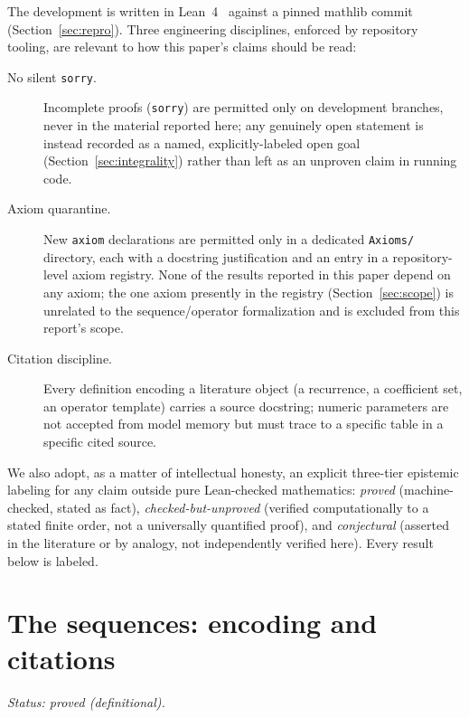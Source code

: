 \documentclass[11pt]{article}
\begin{document}
The development is written in Lean~4~\cite{lean4} against a pinned mathlib
commit (Section~\ref{sec:repro}). Three engineering disciplines, enforced by
repository tooling, are relevant to how this paper's claims should be read:

\begin{description}
  \item[No silent \texttt{sorry}.] Incomplete proofs (\texttt{sorry}) are
    permitted only on development branches, never in the material reported
    here; any genuinely open statement is instead recorded as a named,
    explicitly-labeled open goal (Section~\ref{sec:integrality}) rather than
    left as an unproven claim in running code.
  \item[Axiom quarantine.] New \texttt{axiom} declarations are permitted only
    in a dedicated \texttt{Axioms/} directory, each with a docstring
    justification and an entry in a repository-level axiom registry. None of
    the results reported in this paper depend on any axiom; the one axiom
    presently in the registry (Section~\ref{sec:scope}) is unrelated to the
    sequence/operator formalization and is excluded from this report's scope.
  \item[Citation discipline.] Every definition encoding a literature object
    (a recurrence, a coefficient set, an operator template) carries a source
    docstring; numeric parameters are not accepted from model memory but must
    trace to a specific table in a specific cited source.
\end{description}

We also adopt, as a matter of intellectual honesty, an explicit three-tier
epistemic labeling for any claim outside pure Lean-checked mathematics:
\emph{proved} (machine-checked, stated as fact), \emph{checked-but-unproved}
(verified computationally to a stated finite order, not a universally
quantified proof), and \emph{conjectural} (asserted in the literature or by
analogy, not independently verified here). Every result below is labeled.

\section{The sequences: encoding and citations}
\label{sec:sequences}

\emph{Status: proved (definitional).}
\end{document}
